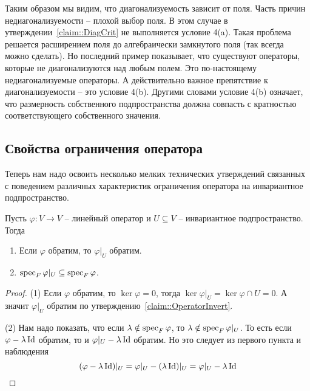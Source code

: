 Таким образом мы видим, что диагонализуемость зависит от поля.
Часть причин недиагонализуемости -- плохой выбор поля.
В этом случае в утверждении~\ref{claim::DiagCrit} не выполняется условие 4(a).
Такая проблема решается расширением поля до алгебраически замкнутого поля (так всегда можно сделать).
Но последний пример показывает, что существуют операторы, которые не диагонализуются над любым полем.
Это по-настоящему недиагонализуемые операторы.
А действительно важное препятствие к диагонализуемости -- это условие 4(b).
Другими словами условие 4(b) означает, что размерность собственного подпространства должна совпасть с кратностью соответствующего собственного значения.

\subsection{Свойства ограничения оператора}

Теперь нам надо освоить несколько мелких технических утверждений связанных с поведением различных характеристик ограничения оператора на инвариантное подпространство.

\begin{claim}
Пусть $\varphi\colon V\to V$ -- линейный оператор и $U\subseteq V$ -- инвариантное подпространство.
Тогда
\begin{enumerate}
\item Если $\varphi$ обратим, то $\varphi|_U$ обратим.

\item $\operatorname{spec}_F \varphi|_U\subseteq \operatorname{spec}_F \varphi$.
\end{enumerate}
\end{claim}
\begin{proof}
(1) Если $\varphi$ обратим, то $\ker \varphi = 0$, тогда $\ker \varphi|_U = \ker \varphi \cap U = 0$.
А значит $\varphi|_U$ обратим по утверждению~\ref{claim::OperatorInvert}.

(2) Нам надо показать, что если $\lambda\notin\operatorname{spec}_F \varphi$, то $\lambda\notin\operatorname{spec}_F \varphi|_U$.
То есть если $\varphi-\lambda\operatorname{Id}$ обратим, то и $\varphi|_U-\lambda \operatorname{Id}$ обратим.
Но это следует из первого пункта и наблюдения 
\[
(\varphi - \lambda \operatorname{Id})|_U = \varphi|_U -(\lambda\operatorname{Id})|_U = \varphi|_U - \lambda \operatorname{Id}
\]
\end{proof}

